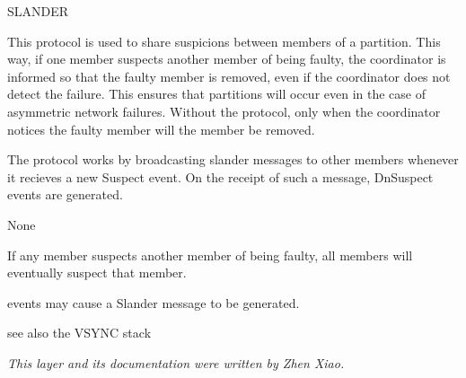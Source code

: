 \begin{Layer}{SLANDER}

This protocol is used to share suspicions between members of a partition.  This
way, if one member suspects another member of being faulty, the coordinator is
informed so that the faulty member is removed, even if the coordinator does not
detect the failure.  This ensures that partitions will occur even in the case
of asymmetric network failures.  Without the protocol, only when the
coordinator notices the faulty member will the member be removed.

\begin{Protocol}
The protocol works by broadcasting slander messages to other members whenever
it recieves a new Suspect event.  On the receipt of such a message, DnSuspect
events are generated.
\end{Protocol}

\begin{Parameters}
\item None
\end{Parameters} 

\begin{Properties}
\item
If any member suspects another member of being faulty, all members will
eventually suspect that member.
\item
{} events may cause a Slander message to be generated.
\end{Properties}

\begin{Sources}
\end{Sources}

\begin{GenEvent}
\end{GenEvent}

\begin{Testing}
\item
see also the VSYNC stack
\end{Testing}

\emph{This layer and its documentation were written by Zhen Xiao.}
\end{Layer}
